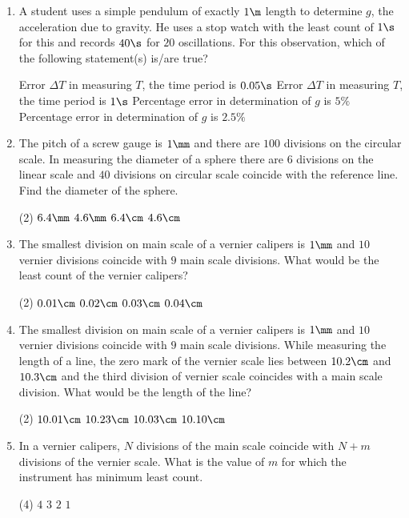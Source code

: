 \documentclass{article}
\renewcommand{\ans}{\quad}
\begin{document}
\begin{enumerate}
    \item A student uses a simple pendulum of exactly $1\m$ length to determine $g$, the acceleration due to gravity. He uses a stop watch with the least count of $1 \s$ for this and records $40 \s$ for $20$ oscillations. For this observation, which of the following statement(s) is/are true?
    \begin{tasks}
        \task Error $\Delta T$ in measuring $T$, the time period is $0.05 \s$\ans
        \task Error $\Delta T$ in measuring $T$, the time period is $1 \s$
        \task Percentage error in determination of $g$ is $5\%$\ans
        \task Percentage error in determination of $g$ is $2.5\%$
    \end{tasks}

    \item The pitch of a screw gauge is $1 \mm$ and there are $100$ divisions on the circular scale. In measuring the diameter of a sphere there are $6$ divisions on the linear scale and $40$ divisions on circular scale coincide with the reference line. Find the diameter of the sphere.
    \begin{tasks}(2)
        \task $6.4 \mm$\ans
        \task $4.6 \mm$
        \task $6.4 \cm$
        \task $4.6 \cm$
    \end{tasks}

    \item The smallest division on main scale of a vernier calipers is $1 \mm$ and $10$ vernier divisions coincide with $9$ main scale divisions. What would be the least count of the vernier calipers?
    \begin{tasks}(2)
        \task $0.01 \cm$\ans
        \task $0.02 \cm$
        \task $0.03 \cm$
        \task $0.04 \cm$
    \end{tasks}

    \item The smallest division on main scale of a vernier calipers is $1 \mm$ and $10$ vernier divisions coincide with $9$ main scale divisions. While measuring the length of a line, the zero mark of the vernier scale lies between $10.2 \cm$ and $10.3 \cm$ and the third division of vernier scale coincides with a main scale division. What would be the length of the line?
    \begin{tasks}(2)
        \task $10.01 \cm$
        \task $10.23 \cm$\ans
        \task $10.03 \cm$
        \task $10.10 \cm$
    \end{tasks}

    \item In a vernier calipers, $N$ divisions of the main scale coincide with $N + m$ divisions of the vernier scale. What is the value of $m$ for which the instrument has minimum least count.
    \begin{tasks}(4)
        \task $4$
        \task $3$
        \task $2$
        \task $1$\ans
    \end{tasks}


    

    


\end{enumerate}


\pagebreak


\end{document}

